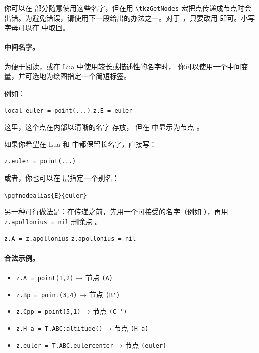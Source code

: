 \medskip
 你可以在  部分随意使用这些名字，但在用 \verb|\tkzGetNodes| 宏把点传递成节点时会出错。为避免错误，请使用下一段给出的办法之一。对于 ，只要改用  即可。小写字母可以在 \TIKZ{} 中取回。

\paragraph{中间名字。}

为便于阅读，或在 Lua 中使用较长或描述性的名字时，
你可以使用一个中间变量，并可选地为绘图指定一个简短标签。

例如：

\begin{mybox}
\verb|local euler = point(...)|
\verb|z.E = euler|
\end{mybox}

这里，这个点在内部以清晰的名字  存放，
但在 \TIKZ{} 中显示为节点 。

如果你希望在 Lua 和 \TIKZ{} 中都保留长名字，直接写：

\begin{mybox}
\verb|z.euler = point(...)|
\end{mybox}

或者，你也可以在 \TIKZ{} 层指定一个别名：

\begin{mybox}
\verb|\pgfnodealias{E}{euler}|
\end{mybox}

另一种可行做法是：在传递之前，先用一个可接受的名字（例如 ），再用 \verb|z.apollonius = nil| 删除点 。

\begin{mybox}
\verb|z.A = z.apollonius|
\verb|z.apollonius = nil|
\end{mybox}



\paragraph{合法示例。}\mbox{}

\begin{mybox}
\begin{itemize}
  \item \verb|z.A = point(1,2)|     → 节点 \verb|(A)|
  \item \verb|z.Bp = point(3,4)|     → 节点 \verb|(B')|
  \item \verb|z.Cpp = point(5,1)|    → 节点 \verb|(C'')|
  \item \verb|z.H_a = T.ABC:altitude()| → 节点 \verb|(H_a)|
  \item \verb|z.euler = T.ABC.eulercenter| → 节点 \verb|(euler)|
\end{itemize}
\end{mybox}

